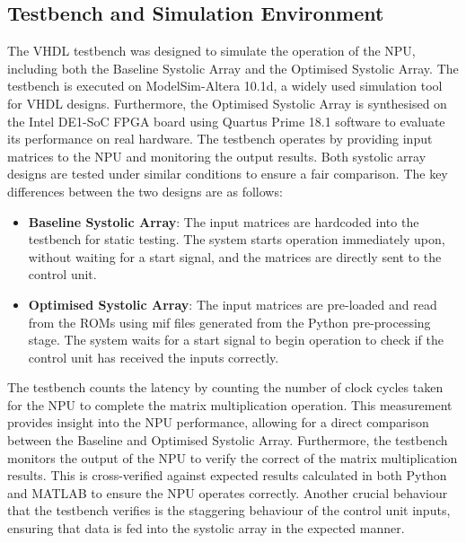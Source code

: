 \documentclass[12pt, a4paper, ukenglish]{article}
\begin{document}
    \subsection{Testbench and Simulation Environment} \label{sec: testbench}
    The VHDL testbench was designed to simulate the operation of the NPU, including both the Baseline Systolic Array and the Optimised Systolic Array. The testbench is executed on ModelSim-Altera 10.1d, a widely used simulation tool for VHDL designs. Furthermore, the Optimised Systolic Array is synthesised on the Intel DE1-SoC FPGA board using Quartus Prime 18.1 software to evaluate its performance on real hardware. 
    \newline
    The testbench operates by providing input matrices to the NPU and monitoring the output results. Both systolic array designs are tested under similar conditions to ensure a fair comparison. The key differences between the two designs are as follows:
    \begin{itemize}
        \item \textbf{Baseline Systolic Array}: The input matrices are hardcoded into the testbench for static testing. The system starts operation immediately upon, without waiting for a start signal, and the matrices are directly sent to the control unit.

        \item \textbf{Optimised Systolic Array}: The input matrices are pre-loaded and read from the ROMs using mif files generated from the Python pre-processing stage. The system waits for a start signal to begin operation to check if the control unit has received the inputs correctly. 
    \end{itemize}

    The testbench counts the latency by counting the number of clock cycles taken for the NPU to complete the matrix multiplication operation. This measurement provides insight into the NPU performance, allowing for a direct comparison between the Baseline and Optimised Systolic Array. Furthermore, the testbench monitors the output of the NPU to verify the correct of the matrix multiplication results. This is cross-verified against expected results calculated in both Python and MATLAB to ensure the NPU operates correctly. Another crucial behaviour that the testbench verifies is the staggering behaviour of the control unit inputs, ensuring that data is fed into the systolic array in the expected manner.
\end{document}

